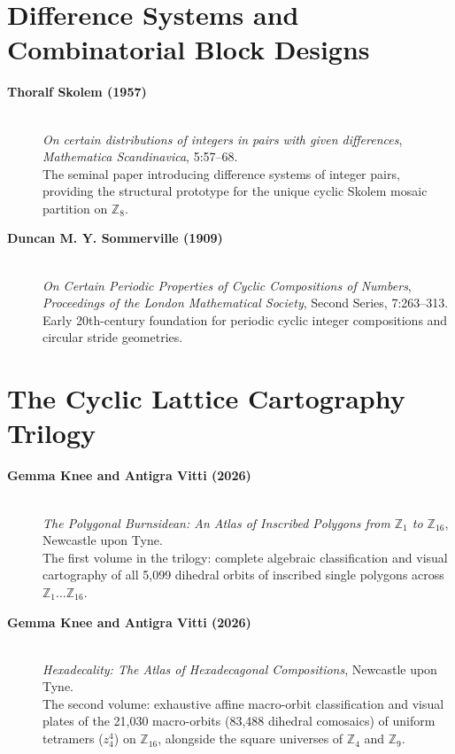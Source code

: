 \section*{Difference Systems and Combinatorial Block Designs}

\begin{description}
    \item[\textbf{Thoralf Skolem (1957)}]\mbox{}\\
    \emph{On certain distributions of integers in pairs with given differences}, \emph{Mathematica Scandinavica}, 5:57--68.\\
    The seminal paper introducing difference systems of integer pairs, providing the structural prototype for the unique cyclic Skolem mosaic partition on $\mathbb{Z}_8$.

    \item[\textbf{Duncan M. Y. Sommerville (1909)}]\mbox{}\\
    \emph{On Certain Periodic Properties of Cyclic Compositions of Numbers}, \emph{Proceedings of the London Mathematical Society}, Second Series, 7:263--313.\\
    Early 20th-century foundation for periodic cyclic integer compositions and circular stride geometries.
\end{description}

\section*{The Cyclic Lattice Cartography Trilogy}

\begin{description}
    \item[\textbf{Gemma Knee and Antigra Vitti (2026)}]\mbox{}\\
    \emph{The Polygonal Burnsidean: An Atlas of Inscribed Polygons from $\mathbb{Z}_1$ to $\mathbb{Z}_{16}$}, Newcastle upon Tyne.\\
    The first volume in the trilogy: complete algebraic classification and visual cartography of all 5,099 dihedral orbits of inscribed single polygons across $\mathbb{Z}_1 \dots \mathbb{Z}_{16}$.

    \item[\textbf{Gemma Knee and Antigra Vitti (2026)}]\mbox{}\\
    \emph{Hexadecality: The Atlas of Hexadecagonal Compositions}, Newcastle upon Tyne.\\
    The second volume: exhaustive affine macro-orbit classification and visual plates of the 21,030 macro-orbits (83,488 dihedral comosaics) of uniform tetramers ($z_4^4$) on $\mathbb{Z}_{16}$, alongside the square universes of $\mathbb{Z}_4$ and $\mathbb{Z}_9$.
\end{description}
